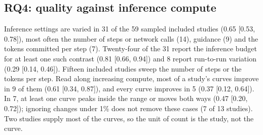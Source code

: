 \subsection{RQ4: quality against inference compute}
\label{sec:rq4}
Inference settings are varied in 31 of the 59 sampled included studies (0.65 [0.53, 0.78]), most often the number of steps or network calls (14), guidance (9) and the tokens committed per step (7). Twenty-four of the 31 report the inference budget for at least one such contrast (0.81 [0.66, 0.94]) and 8 report run-to-run variation (0.29 [0.14, 0.46]). %
Fifteen included studies sweep the number of steps or the tokens per step. Read along increasing compute, most of a study's curves improve in 9 of them (0.61 [0.34, 0.87]), and every curve improves in 5 (0.37 [0.12, 0.64]). In 7, at least one curve peaks inside the range or moves both ways (0.47 [0.20, 0.72]); ignoring changes under 1\% does not remove these cases (7 of 13 studies). Two studies supply most of the curves, so the unit of count is the study, not the curve.%
